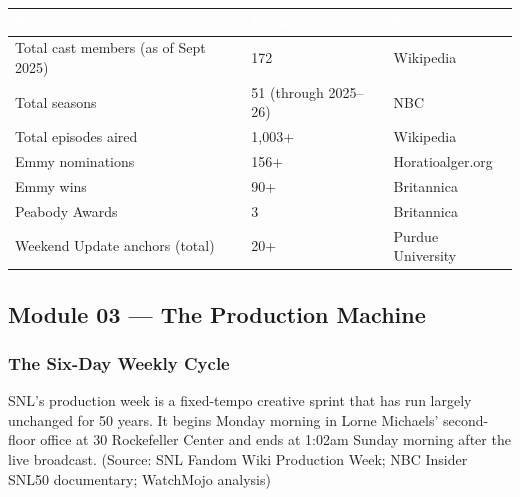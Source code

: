 \documentclass[11pt,letterpaper]{article}
\newcommand{\tableheader}[1]{\textbf{\sffamily\textcolor{white}{#1}}}
\begin{document}
\begin{center}
\begin{tabularx}{\textwidth}{XC{2.5cm}C{2.5cm}}
\toprule
{}
\tableheader{Metric} & \tableheader{Value} & \tableheader{Source} \\
\midrule
Total cast members (as of Sept 2025) & 172 & Wikipedia \\
Total seasons & 51 (through 2025--26) & NBC \\
Total episodes aired & 1,003+ & Wikipedia \\
Emmy nominations & 156+ & Horatioalger.org \\
Emmy wins & 90+ & Britannica \\
Peabody Awards & 3 & Britannica \\
Weekend Update anchors (total) & 20+ & Purdue University \\
\bottomrule
\end{tabularx}
\end{center}

\subsection{Module 03 --- The Production Machine}

\subsubsection{The Six-Day Weekly Cycle}

SNL's production week is a fixed-tempo creative sprint that has run largely unchanged for 50 years. It begins Monday morning in Lorne Michaels' second-floor office at 30 Rockefeller Center and ends at 1:02am Sunday morning after the live broadcast. (Source: SNL Fandom Wiki Production Week; NBC Insider SNL50 documentary; WatchMojo analysis)
\end{document}
